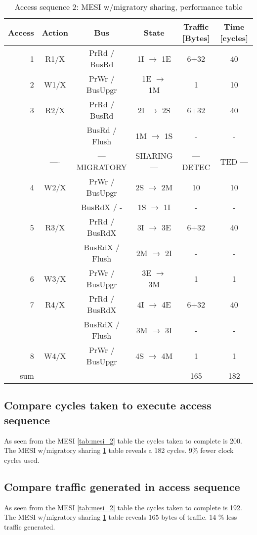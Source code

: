 \documentclass[a4paper,10pt]{article}
\begin{document}
\begin{table}[h!]
  \centering
  \begin{tabular}{rccccc}
    Access & Action & Bus & State & Traffic [Bytes] & Time [cycles] \\ \hline
     1 & R1/X & PrRd / BusRd & 1I $\rightarrow$ 1E  & 6+32 & 40 \\
     2 & W1/X & PrWr / BusUpgr & 1E $\rightarrow$ 1M & 1 & 10 \\

     3 & R2/X & PrRd / BusRd & 2I $\rightarrow$ 2S  & 6+32 & 40 \\
       &      & BusRd / Flush & 1M $\rightarrow$ 1S & - & - \\
       & ---- & --- MIGRATORY  & SHARING --- & --- DETEC & TED --- \\
     4 & W2/X & PrWr / BusUpgr & 2S $\rightarrow$ 2M & 10 & 10 \\
       &      & BusRdX / - & 1S $\rightarrow$ 1I & - & - \\

     5 & R3/X & PrRd / BusRdX & 3I $\rightarrow$ 3E  & 6+32 &  40 \\
       &      & BusRdX / Flush & 2M $\rightarrow$ 2I & - & - \\
     6 & W3/X & PrWr / BusUpgr & 3E $\rightarrow$ 3M & 1 & 1 \\

     7 & R4/X & PrRd / BusRdX & 4I $\rightarrow$ 4E  & 6+32 & 40 \\
       &      & BusRdX / Flush & 3M $\rightarrow$ 3I & - & - \\
     8 & W4/X & PrWr / BusUpgr & 4S $\rightarrow$ 4M & 1 & 1 \\ \hline

    sum & & & & 165 & 182 \\ \hline \hline
  \end{tabular}
  \caption{Access sequence 2: MESI w/migratory sharing, performance table}
  \label{tab:mesi_2_migration}
\end{table}

\subsection{Compare cycles taken to execute access sequence}
As seen from the MESI \ref{tab:mesi_2} table the cycles taken to complete is 200.
The MESI w/migratory sharing \ref{tab:mesi_2_migration} table reveals a 182 cycles. 9\% fewer clock cycles used.

\subsection{Compare traffic generated in access sequence}
As seen from the MESI \ref{tab:mesi_2} table the cycles taken to complete is 192.
The MESI w/migratory sharing \ref{tab:mesi_2_migration} table reveals 165 bytes of traffic. 14 \% less traffic generated.
\end{document}
